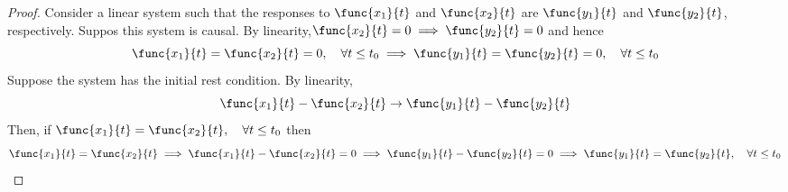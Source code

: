 \begin{proof}
    Consider a linear system such that the responses to \(\func{x_1}{t}\) and \(\func{x_2}{t}\) are \(\func{y_1}{t}\) and \(\func{y_2}{t}\), respectively. Suppos this system is causal. By linearity,\(\func{x_2}{t} = 0 \implies \func{y_2}{t} = 0\) and hence 
    \begin{equation*}
        \func{x_1}{t} = \func{x_2}{t} = 0,\quad \forall t \leq t_0 \implies \func{y_1}{t} = \func{y_2}{t} = 0 , \quad \forall t \leq t_0
    \end{equation*}
    Suppose the system has the initial rest condition. By linearity, 
    \begin{equation*}
         \func{x_1}{t} - \func{x_2}{t} \to \func{y_1}{t} - \func{y_2}{t}
    \end{equation*}
    Then, if \(\func{x_1}{t} = \func{x_2}{t} , \quad \forall t \leq t_0\) then 
    \begin{equation*}
        \func{x_1}{t} = \func{x_2}{t} \implies \func{x_1}{t} - \func{x_2}{t} = 0 \implies \func{y_1}{t} - \func{y_2}{t} = 0 \implies \func{y_1}{t} = \func{y_2}{t} , \quad \forall t \leq t_0
    \end{equation*} 
 \end{proof}
